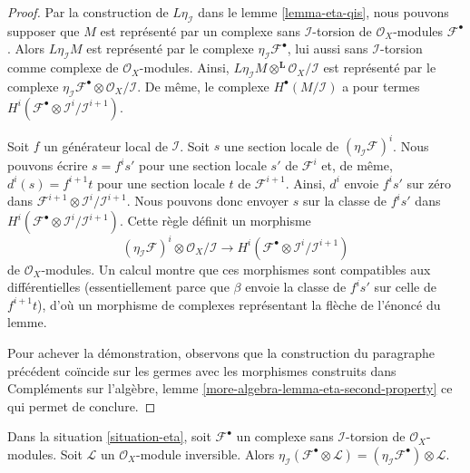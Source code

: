 \begin{proof}
Par la construction de $L\eta_\mathcal{I}$ dans le lemme \ref{lemma-eta-qis}, nous pouvons supposer que $M$ est représenté par un complexe sans $\mathcal{I}$-torsion de $\mathcal{O}_X$-modules $\mathcal{F}^\bullet$. Alors $L\eta_\mathcal{I}M$ est représenté par le complexe $\eta_\mathcal{I}\mathcal{F}^\bullet$, lui aussi sans $\mathcal{I}$-torsion comme complexe de $\mathcal{O}_X$-modules. Ainsi, $L\eta_\mathcal{I}M \otimes^\mathbf{L} \mathcal{O}_X/\mathcal{I}$ est représenté par le complexe $\eta_\mathcal{I}\mathcal{F}^\bullet \otimes \mathcal{O}_X/\mathcal{I}$. De même, le complexe $H^\bullet(M/\mathcal{I})$ a pour termes $H^i(\mathcal{F}^\bullet \otimes \mathcal{I}^i/\mathcal{I}^{i + 1})$.

\medskip\noindent

Soit $f$ un générateur local de $\mathcal{I}$. Soit $s$ une section locale de $(\eta_\mathcal{I}\mathcal{F})^i$. Nous pouvons écrire $s = f^is'$ pour une section locale $s'$ de
$\mathcal{F}^i$ et, de même, $d^i(s) = f^{i + 1}t$ pour une section locale $t$ de $\mathcal{F}^{i + 1}$. Ainsi, $d^i$ envoie $f^is'$
sur zéro dans $\mathcal{F}^{i + 1} \otimes \mathcal{I}^i/\mathcal{I}^{i + 1}$. Nous pouvons donc envoyer $s$ sur la classe de $f^is'$ dans
$H^i(\mathcal{F}^\bullet \otimes \mathcal{I}^i/\mathcal{I}^{i + 1})$. Cette règle définit un morphisme
$$
(\eta_\mathcal{I}\mathcal{F})^i \otimes \mathcal{O}_X/\mathcal{I}
\longrightarrow
H^i(\mathcal{F}^\bullet \otimes \mathcal{I}^i/\mathcal{I}^{i + 1})
$$
de $\mathcal{O}_X$-modules. Un calcul montre que ces morphismes sont compatibles aux différentielles (essentiellement parce que $\beta$
envoie la classe de $f^is'$ sur celle de $f^{i + 1}t$), d'où un morphisme de complexes représentant la flèche de l'énoncé du lemme.

\medskip\noindent

Pour achever la démonstration, observons que la construction du paragraphe précédent coïncide sur les germes avec les morphismes construits dans Compléments sur l'algèbre, lemme
\ref{more-algebra-lemma-eta-second-property}
ce qui permet de conclure.

\end{proof}

\begin{lemma}

\label{lemma-eta-tensor-invertible}
Dans la situation \ref{situation-eta}, soit $\mathcal{F}^\bullet$ un complexe sans $\mathcal{I}$-torsion de $\mathcal{O}_X$-modules. Soit $\mathcal{L}$ un $\mathcal{O}_X$-module inversible. Alors $\eta_\mathcal{I}(\mathcal{F}^\bullet \otimes \mathcal{L}) =
(\eta_\mathcal{I}\mathcal{F}^\bullet) \otimes \mathcal{L}$.
\end{lemma}

